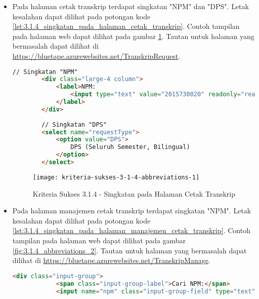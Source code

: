 \begin{itemize}
    \item Pada halaman cetak transkrip terdapat singkatan "NPM" dan "DPS". Letak kesalahan dapat dilihat pada potongan kode \ref{lst:3.1.4_singkatan_pada_halaman_cetak_transkrip}. Contoh tampilan pada halaman web dapat dilihat pada gambar \ref{fig:3.1.4_abbreviations_1}. Tautan untuk halaman yang bermasalah dapat dilihat di \url{https://bluetape.azurewebsites.net/TranskripRequest}.
    \begin{lstlisting}[frame=single, label={lst:3.1.4_singkatan_pada_halaman_cetak_transkrip}, language=HTML, caption=Kriteria Sukses 3.1.4 - Singkatan pada Halaman Cetak Transkrip]
        // Singkatan "NPM"
        <div class="large-4 column">
            <label>NPM:
                <input type="text" value="2015730020" readonly="readonly"/>
            </label>
        </div>
        
        // Singkatan "DPS"
        <select name="requestType">
            <option value="DPS">
                DPS (Seluruh Semester, Bilingual)
            </option>
        </select>
    \end{lstlisting}

    \begin{figure}[H]
        \centering  
        \texttt{[image: kriteria-sukses-3-1-4-abbreviations-1]}  
        \caption[Kriteria Sukses 3.1.4 - Singkatan pada Halaman Cetak Transkrip]{Kriteria Sukses 3.1.4 - Singkatan pada Halaman Cetak Transkrip}
        \label{fig:3.1.4_abbreviations_1}  
    \end{figure}

    \item Pada halaman manajemen cetak transkrip terdapat singkatan "NPM". Letak kesalahan dapat dilihat pada potongan kode \ref{lst:3.1.4_singkatan_pada_halaman_manajemen_cetak_transkrip}. Contoh tampilan pada halaman web dapat dilihat pada gambar \ref{fig:3.1.4_abbreviations_2}. Tautan untuk halaman yang bermasalah dapat dilihat di \url{https://bluetape.azurewebsites.net/TranskripManage}.
    \begin{lstlisting}[frame=single, label={lst:3.1.4_singkatan_pada_halaman_manajemen_cetak_transkrip}, language=HTML, caption=Kriteria Sukses 3.1.4 - Singkatan pada Halaman Manajemen Cetak Transkrip]
        <div class="input-group">
            <span class="input-group-label">Cari NPM:</span>
            <input name="npm" class="input-group-field" type="text" placeholder="2013730013" maxlength="10" minlength="10"/>
    \end{lstlisting}


\end{itemize}
